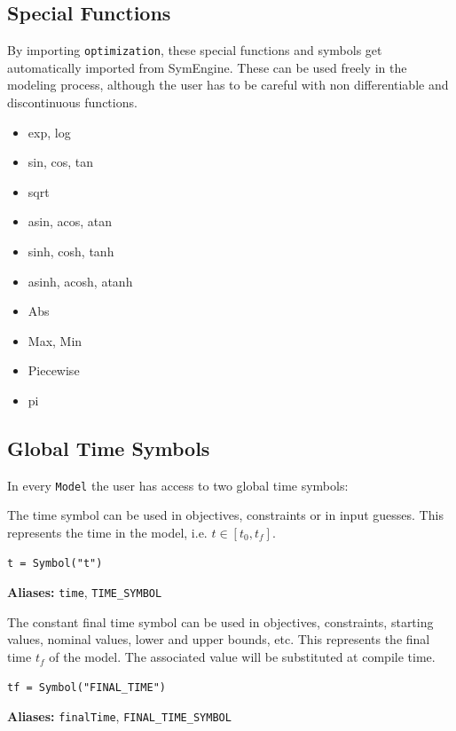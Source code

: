 \documentclass[12pt]{article}
\begin{document}
	\subsection{Special Functions}
	\label{c:specialFunction}
	By importing \texttt{optimization}, these special functions and symbols get automatically imported from SymEngine. These can be used freely in the modeling process, although the user has to be careful with non differentiable and discontinuous functions.
	\begin{itemize}
		\item exp, log
		\item sin, cos, tan
		\item sqrt
		\item asin, acos, atan
		\item sinh, cosh, tanh
		\item asinh, acosh, atanh
		\item Abs
		\item Max, Min	
		\item Piecewise
		\item pi	
	\end{itemize}
	
	\subsection{Global Time Symbols}
	\label{c:globaltime}
	In every \texttt{Model} the user has access to two global time symbols:
	
	\begin{mdframed}[backgroundcolor=gray!10, roundcorner=10pt, linewidth=1pt]
		
		The time symbol can be used in objectives, constraints or in input guesses. This represents the time in the model, i.e. $t \in [t_0, t_f]$.
		
		\begin{lstlisting}
t = Symbol("t")
		\end{lstlisting}
		\label{timeSymbol}

		\textbf{Aliases:} \texttt{time}, \texttt{TIME\_SYMBOL}
	\end{mdframed}
	
	\begin{mdframed}[backgroundcolor=gray!10, roundcorner=10pt, linewidth=1pt]
		
		The constant final time symbol can be used in objectives, constraints, starting values, nominal values, lower and upper bounds, etc.
		This represents the final time $t_f$ of the model. The associated value will be substituted at compile time.
		
		\begin{lstlisting}
tf = Symbol("FINAL_TIME")
		\end{lstlisting}
		\label{finalTimeSymbol}
		
		\textbf{Aliases:} \texttt{finalTime}, \texttt{FINAL\_TIME\_SYMBOL}
	\end{mdframed}
	
\end{document}
